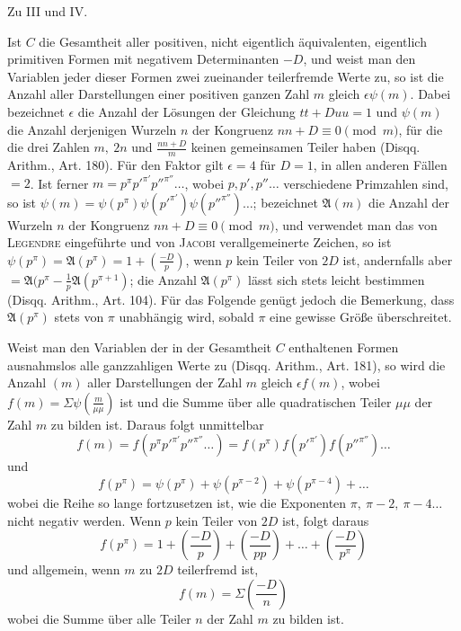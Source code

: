 \par\medskip{}\centerline{Zu III und IV.}\smallskip
Ist $C$ die Gesamtheit aller positiven, nicht eigentlich äquivalenten, eigentlich primitiven Formen mit negativem Determinanten $-D$, und weist man den Variablen jeder dieser Formen zwei zueinander teilerfremde Werte zu, so ist die Anzahl aller Darstellungen einer positiven ganzen Zahl $m$ gleich $\epsilon\psi(m)$. Dabei bezeichnet $\epsilon$ die Anzahl der Lösungen der Gleichung $tt+Duu=1$ und $\psi(m)$ die Anzahl derjenigen Wurzeln $n$ der Kongruenz $nn+D\equiv0\pmod m$, für die die drei Zahlen $m,\ 2n$ und $\frac{nn+D}m$ keinen gemeinsamen Teiler haben (Disqq. Arithm., Art. 180). Für den Faktor gilt $\epsilon$$=4$ für $D=1$, in allen anderen Fällen $=2$. Ist ferner $m=p^\pi p'^{\pi'}p''^{\pi''}\ldots$, wobei $p,p',p''\ldots$ verschiedene Primzahlen sind, so ist $\psi(m)=\psi(p^\pi)\psi(p'^{\pi'})\psi(p''^{\pi''})\ldots$; bezeichnet $\mathfrak A(m)$ die Anzahl der Wurzeln $n$ der Kongruenz $nn+D\equiv0\pmod m$, und verwendet man das von \textsc{Legendre} eingeführte und von \textsc{Jacobi} verallgemeinerte Zeichen, so ist $\psi(p^\pi)=\mathfrak A(p^\pi)=1+\left(\frac{-D}p\right)$, wenn $p$ kein Teiler von $2D$ ist, andernfalls aber $=\mathfrak A(p^\pi-\frac1p\mathfrak A(p^{\pi+1})$; die Anzahl $\mathfrak A(p^\pi)$ lässt sich stets leicht bestimmen (Disqq. Arithm., Art. 104). Für das Folgende genügt jedoch die Bemerkung, dass $\mathfrak A(p^\pi)$ stets von $\pi$ unabhängig wird, sobald $\pi$ eine gewisse Größe überschreitet.

Weist man den Variablen der in der Gesamtheit $C$ enthaltenen Formen ausnahmslos alle ganzzahligen Werte zu (Disqq. Arithm., Art. 181), so wird die Anzahl $(m)$ aller Darstellungen der Zahl $m$ gleich $\epsilon f(m)$, wobei $f(m)=\Sigma\psi\left(\frac m{\mu\mu}\right)$ ist und die Summe über alle quadratischen Teiler $\mu\mu$ der Zahl $m$ zu bilden ist. Daraus folgt unmittelbar
\[
f(m)=f(p^\pi p'^{\pi'}p''^{\pi''}\ldots)=f(p^\pi)f(p'^{\pi'})f(p''^{\pi''})\ldots
\]
und
\[
f(p^\pi)=\psi(p^\pi)+\psi(p^{\pi-2})+\psi(p^{\pi-4})+\ldots
\]
wobei die Reihe so lange fortzusetzen ist, wie die Exponenten $\pi,\ \pi-2,\ \pi-4\ldots$ nicht negativ werden. Wenn $p$ kein Teiler von $2D$ ist, folgt daraus
\[
f(p^\pi)=1+\left(\frac{-D}p\right)+\left(\frac{-D}{pp}\right)+\ldots+\left(\frac{-D}{p^\pi}\right)
\]
und allgemein, wenn $m$ zu $2D$ teilerfremd ist,
\[
f(m)=\Sigma\left(\frac{-D}n\right)
\]
wobei die Summe über alle Teiler $n$ der Zahl $m$ zu bilden ist.

